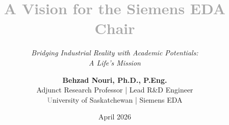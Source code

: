 %
%
\documentclass[9pt,aspectratio=169]{beamer}
\RequirePackage{./.xbmr}

\title[EDA chair]{\Huge \textbf{\textcolor{darkgray}{A Vision for the Siemens EDA Chair}}}

\subtitle{{\Large \textit{Bridging Industrial Reality with Academic Potentials:}}\\[6pt]
{\Large \textit{A Life's Mission}}}
\author{\textbf{Behzad Nouri, Ph.D., P.Eng.} \\
    {\small Adjunct Research Professor | Lead R\&D Engineer} \\[6pt]
    {\footnotesize \textcolor{gray} University of Saskatchewan | Siemens EDA}
    }
\date{April 2026}

\addtitlepage
\addtoc












